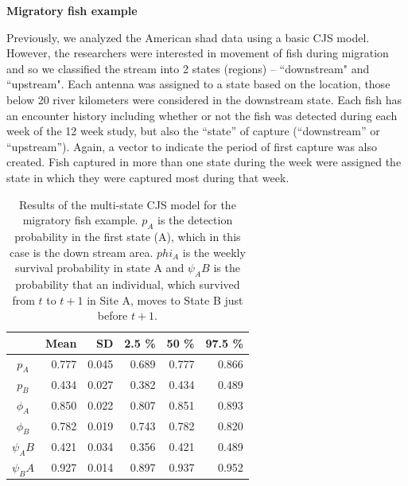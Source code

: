 
{\bf Migratory fish example}

Previously, we analyzed the American shad data using a basic CJS
model.  However,
the researchers were interested in movement of fish during migration and so we
classified the stream into 2 states (regions) -- ``downstream" and ``upstream".  Each antenna was assigned
to a state based on the location, those below 20 river kilometers were considered in
the downstream state.  Each fish has an encounter history including whether or not the fish was
detected during each week of the 12 week study, but also the ``state'' of capture
(``downstream'' or ``upstream'').  Again, a vector to indicate the period of first capture was also
created.  Fish captured in more than one state during the week were assigned the state in which 
they were captured most during that week.


\begin{table}
\centering
\caption{
Results of the multi-state CJS model for the migratory fish example.  $p_A$ is the detection probability in the first state (A), which in this case is the down stream area.  $phi_A$ is the weekly survival probability in state A and $\psi_AB$ is the probability that an individual, which survived from $t$ to $t+1$ in Site A, moves to State B just
before $t+1$.
}
\begin{tabular}{crrrrr}
\hline \hline
&       Mean   &  SD  &  2.5 \%   &   50 \%    &  97.5 \%  \\  \hline
$p_A$ & 0.777 & 0.045 & 0.689  & 0.777  & 0.866 \\
$p_B$  & 0.434  & 0.027 & 0.382 & 0.434  & 0.489 \\
$\phi_A$  & 0.850 & 0.022 & 0.807  & 0.851  & 0.893  \\
$\phi_B$  & 0.782  & 0.019 & 0.743  & 0.782& 0.820  \\
$\psi_AB$ & 0.421 & 0.034 & 0.356  & 0.421 &  0.489 \\
$\psi_BA$& 0.927 & 0.014 & 0.897  & 0.937 &  0.952  \\

\hline
\end{tabular}
\label{open.tab.multi-shad}
\end{table}

